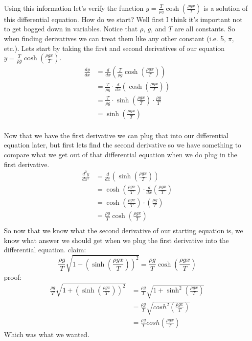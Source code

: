 \documentclass[12pt]{article}
\begin{document}
Using this information let's verify the function $y = \frac{T}{\rho g}\cosh{\left(\frac{\rho gx}{T}\right)}$ is a solution of this differential equation. How do we start? Well first I think it's important not to get bogged down in variables. Notice that $\rho$, $g$, and $T$ are all constants. So when finding derivatives we can treat them like any other constant (i.e. 5, $\pi$, etc.). Lets start by taking the first and second derivatives of our equation $y = \frac{T}{\rho g}\cosh{\left(\frac{\rho gx}{T}\right)}$.
\begin{align} \nonumber
\frac{dy}{dx} &= \frac{d}{dx}\left( \frac{T}{\rho g}\cosh{\left( \frac{\rho gx}{T}\right)} \right)\\ \nonumber
&= \frac{T}{\rho g} \cdot \frac{d}{dx}\left( \cosh{\left( \frac{\rho gx}{T}\right)} \right)\\ \nonumber
&= \frac{T}{\rho g} \cdot \sinh{\left( \frac{\rho gx}{T} \right)} \cdot\frac{\rho g}{T}\\ \nonumber
&= \sinh{\left( \frac{\rho gx}{T} \right)}\\ \nonumber  
\end{align}

Now that we have the first derivative we can plug that into our differential equation later, but first lets find the second derivative so we have something to compare what we get out of that differential equation when we do plug in the first derivative.
\begin{align} \nonumber
\frac{d^2y}{dx^2} &= \frac{d}{dx}\left( \sinh{\left( \frac{\rho gx}{T}\right)}\right)\\ \nonumber
&= \cosh{\left( \frac{\rho gx}{T}\right)} \cdot \frac{d}{dx}\left( \frac{\rho gx}{T} \right)\\ \nonumber
&= \cosh{\left( \frac{\rho gx}{T}\right)} \cdot \left( \frac{\rho g}{T} \right)\\ \nonumber
&= \frac{\rho g}{T} \cosh{\left( \frac{\rho gx}{T}\right)}\\ \nonumber
\end{align}
So now that we know what the second derivative of our starting equation is, we know what answer we should get when we plug the first derivative into the differential equation.
\newline
\newline
claim: \[\frac{\rho g}{T}\sqrt{1 + \left(\sinh{\left( \frac{\rho gx}{T} \right)}\right)^2} = \frac{\rho g}{T} \cosh{\left( \frac{\rho gx}{T}\right)}\]
\newline
proof: 
\begin{align} \nonumber
\frac{\rho g}{T}\sqrt{1 + \left(\sinh{\left( \frac{\rho gx}{T} \right)}\right)^2} &= \frac{\rho g}{T}\sqrt{1 + \sinh^2{\left( \frac{\rho gx}{T} \right)}}\\ \nonumber
 &= \frac{\rho g}{T}\sqrt{cosh^2{\left( \frac{\rho gx}{T} \right)}}\\ \nonumber
 &= \frac{\rho g}{T}cosh{\left( \frac{\rho gx}{T} \right)}
\end{align}
Which was what we wanted.
\end{document}
